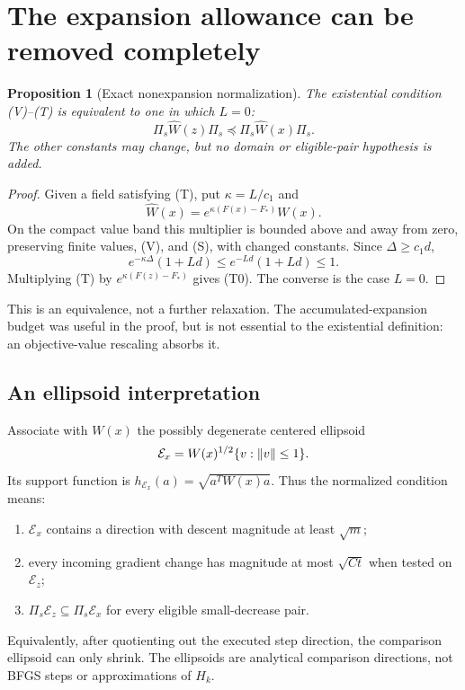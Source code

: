 \documentclass[10pt,oneside,openany]{book}
\newtheorem{proposition}{Proposition}[chapter]
\theoremstyle{remark}\newtheorem{remark}{Remark}[chapter]
\begin{document}
\section{The expansion allowance can be removed completely}
\begin{proposition}[Exact nonexpansion normalization]
The existential condition (V)--(T) is equivalent to one in which $L=0$:
\begin{equation}
 \Pi_s\widehat W(z)\Pi_s\preceq\Pi_s\widehat W(x)\Pi_s. \tag{G.T0}
\end{equation}
The other constants may change, but no domain or eligible-pair hypothesis is added.
\end{proposition}
\begin{proof}
Given a field satisfying (T), put $\kappa=L/c_1$ and
\[
 \widehat W(x)=e^{\kappa(F(x)-F_*)}W(x).
\]
On the compact value band this multiplier is bounded above and away from zero, preserving finite values, (V), and (S), with changed constants. Since $\Delta\ge c_1d$,
\[
 e^{-\kappa\Delta}(1+Ld)\le e^{-Ld}(1+Ld)\le1.
\]
Multiplying (T) by $e^{\kappa(F(z)-F_*)}$ gives (T0). The converse is the case $L=0$.
\end{proof}
This is an equivalence, not a further relaxation. The accumulated-expansion budget was useful in the proof, but is not essential to the existential definition: an objective-value rescaling absorbs it.

\subsection{An ellipsoid interpretation}
Associate with $W(x)$ the possibly degenerate centered ellipsoid
\[
 \mathcal E_x=W(x)^{1/2}\{v:\left\lVert v\right\rVert\le1\}.
\]
Its support function is $h_{\mathcal E_x}(a)=\sqrt{a^TW(x)a}$. Thus the normalized condition means:
\begin{enumerate}[label=(\roman*),itemsep=3pt]
\item $\mathcal E_x$ contains a direction with descent magnitude at least $\sqrt m$;
\item every incoming gradient change has magnitude at most $\sqrt{Ct}$ when tested on $\mathcal E_z$;
\item $\Pi_s\mathcal E_z\subseteq\Pi_s\mathcal E_x$ for every eligible small-decrease pair.
\end{enumerate}
Equivalently, after quotienting out the executed step direction, the comparison ellipsoid can only shrink. The ellipsoids are analytical comparison directions, not BFGS steps or approximations of $H_k$.
\end{document}

